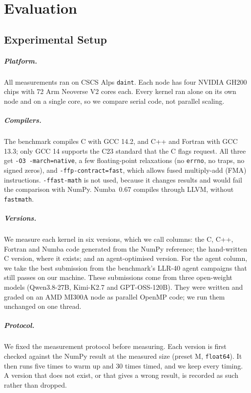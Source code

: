 \chapter{Evaluation}
\label{ch:evaluation}

\section{Experimental Setup}
\label{sec:setup}

\paragraph{Platform.}
All measurements ran on CSCS Alps \texttt{daint}. Each node has four NVIDIA GH200 chips with 72
Arm Neoverse V2 cores each. Every kernel ran alone on its own node and on a single core, so we
compare serial code, not parallel scaling.

\paragraph{Compilers.}
The benchmark compiles C with GCC 14.2, and C++ and Fortran with GCC 13.3; only GCC 14 supports
the C23 standard that the C flags request. All three get \texttt{-O3 -march=native}, a few
floating-point relaxations (no \texttt{errno}, no traps, no signed zeros), and
\texttt{-ffp-contract=fast}, which allows fused multiply-add (FMA) instructions.
\texttt{-ffast-math} is not used, because it changes results and would fail the comparison
with NumPy. Numba~0.67 compiles through LLVM, without \texttt{fastmath}.

\paragraph{Versions.}
We measure each kernel in six versions, which we call columns: the C, C++, Fortran and Numba
code generated from the NumPy reference; the hand-written C version, where it exists; and an
agent-optimised version. For the agent column, we take the best submission from the
benchmark's LLR-40 agent campaigns that still passes on our machine. These submissions come
from three open-weight models (Qwen3.8-27B, Kimi-K2.7 and GPT-OSS-120B). They were written and
graded on an AMD MI300A node as parallel OpenMP code; we run them unchanged on one thread.

\paragraph{Protocol.}
We fixed the measurement protocol before measuring. Each version is first checked against the
NumPy result at the measured size (preset M, \texttt{float64}). It then runs five times to warm
up and 30 times timed, and we keep every timing. A version that does not exist, or that gives a
wrong result, is recorded as such rather than dropped.

